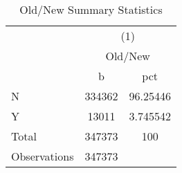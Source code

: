 {
\def\sym#1{\ifmmode^{#1}\else\(^{#1}\)\fi}
\begin{longtable}{l*{1}{cc}}
\caption{Old/New Summary Statistics}\\
\toprule\endfirsthead\midrule\endhead\midrule\endfoot\endlastfoot
                    &\multicolumn{2}{c}{(1)}  \\
                    &\multicolumn{2}{c}{Old/New}\\
                    &           b&         pct\\
\midrule
N                   &      334362&    96.25446\\
Y                   &       13011&    3.745542\\
Total               &      347373&         100\\
\midrule
Observations        &      347373&            \\
\bottomrule
\end{longtable}
\label{tab:summary_ON}
}
